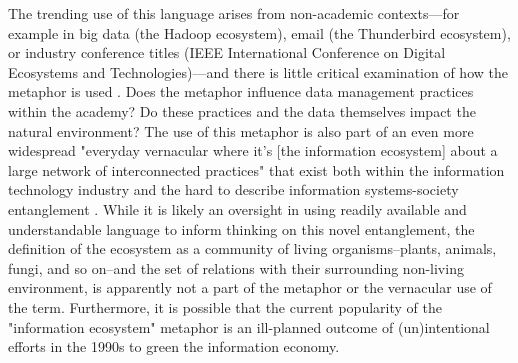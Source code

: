 The trending use of this language arises from non-academic contexts—for example in big data (the Hadoop ecosystem), email (the Thunderbird ecosystem), or industry conference titles (IEEE International Conference on Digital Ecosystems and Technologies)—and there is little critical examination of how the metaphor is used \citep[although see][]{stepp_1999}. Does the metaphor influence data management practices within the academy? Do these practices and the data themselves impact the natural environment? The use of this metaphor is also part of an even more widespread "everyday vernacular where it’s [the information ecosystem] about a large network of interconnected practices" that exist both within the information technology industry and the hard to describe information systems-society entanglement \citep{boyd_2016}. While it is likely an oversight in using readily available and understandable language to inform thinking on this novel entanglement, the definition of the ecosystem as a community of living organisms--plants, animals, fungi, and so on--and the set of relations with their surrounding non-living environment, is apparently not a part of the metaphor or the vernacular use of the term. Furthermore, it is possible that the current popularity of the "information ecosystem" metaphor is an ill-planned outcome of (un)intentional efforts in the 1990s to green the information economy.

